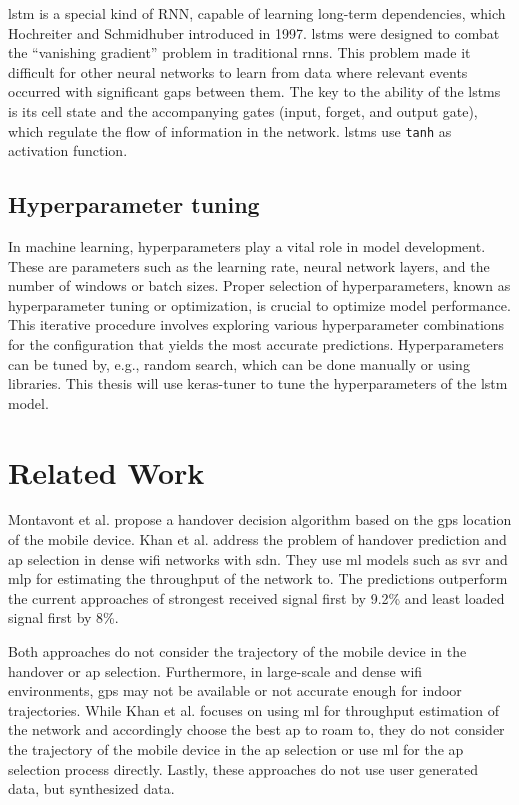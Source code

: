\ac{lstm} is a special kind of RNN, capable of learning long-term dependencies, which Hochreiter and Schmidhuber introduced in 1997\cite{lstm-hochreiter}.
\acp{lstm} were designed to combat the ``vanishing gradient'' problem in traditional \acp{rnn}. 
This problem made it difficult for other neural networks to learn from data where relevant events occurred with significant gaps between them.
The key to the ability of the \acp{lstm} is its cell state and the accompanying gates (input, forget, and output gate), which regulate the flow of information in the network.
\acp{lstm} use \texttt{tanh} as activation function.

\subsection{Hyperparameter tuning}

In machine learning, hyperparameters play a vital role in model development.
These are parameters such as the learning rate, neural network layers, and the number of windows or batch sizes.
Proper selection of hyperparameters, known as hyperparameter tuning or optimization, is crucial to optimize model performance.
This iterative procedure involves exploring various hyperparameter combinations for the configuration that yields the most accurate predictions.
Hyperparameters can be tuned by, e.g., random search, which can be done manually or using libraries.
This thesis will use keras-tuner\cite{keras_tuner} to tune the hyperparameters of the \ac{lstm} model.

\section{Related Work}

Montavont et al. \cite{handover-assisted-by-gps} propose a handover decision algorithm based on the \ac{gps} location of the mobile device.
Khan et al. \cite{MLBasedHandoverPrediction2022} address the problem of handover prediction and \ac{ap} selection in dense \ac{wifi} networks with \ac{sdn}.
They use \ac{ml} models such as \ac{svr} and \ac{mlp} for estimating the throughput of the network to.
The predictions outperform the current approaches of strongest received signal first by 9.2\% and least loaded signal first by 8\%.

Both approaches do not consider the trajectory of the mobile device in the handover or \ac{ap} selection.
Furthermore, in large-scale and dense \ac{wifi} environments, \ac{gps} may not be available or not accurate enough for indoor trajectories.
While Khan et al. focuses on using \ac{ml} for throughput estimation of the network and accordingly choose the best \ac{ap} to roam to, they do not consider the trajectory of the mobile device in the \ac{ap} selection or use \ac{ml} for the \ac{ap} selection process directly.
Lastly, these approaches do not use user generated data, but synthesized data.

